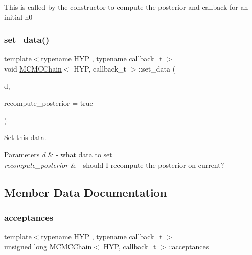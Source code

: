 This is called by the constructor to compute the posterior and callback for an initial h0\mbox{\label{class_m_c_m_c_chain_abffc3094cfcb23d692a5e1ab467d3e45}} 
\subsubsection{\texorpdfstring{set\+\_\+data()}{set\_data()}}
{\footnotesize\ttfamily template$<$typename H\+YP , typename callback\+\_\+t $>$ \\
void \hyperlink{class_m_c_m_c_chain}{M\+C\+M\+C\+Chain}$<$ H\+YP, callback\+\_\+t $>$\+::set\+\_\+data (\begin{DoxyParamCaption}\item[{typename H\+Y\+P\+::data\+\_\+t $\ast$}]{d,  }\item[{bool}]{recompute\+\_\+posterior = {\ttfamily true} }\end{DoxyParamCaption})\hspace{0.3cm}{\ttfamily [inline]}}



Set this data. 


\begin{DoxyParams}{Parameters}
{\em d} & -\/ what data to set \\
\hline
{\em recompute\+\_\+posterior} & -\/ should I recompute the posterior on current? \\
\hline
\end{DoxyParams}


\subsection{Member Data Documentation}
\mbox{\label{class_m_c_m_c_chain_ae1597e42074b2efb93ace3e40f1f7a45}} 
\subsubsection{\texorpdfstring{acceptances}{acceptances}}
{\footnotesize\ttfamily template$<$typename H\+YP , typename callback\+\_\+t $>$ \\
unsigned long \hyperlink{class_m_c_m_c_chain}{M\+C\+M\+C\+Chain}$<$ H\+YP, callback\+\_\+t $>$\+::acceptances}

